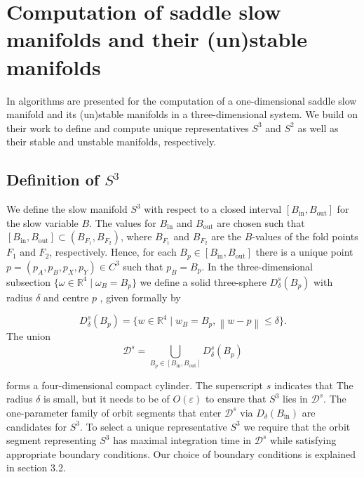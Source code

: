 \documentclass{ws-ijbc}
\begin{document}
 \section{Computation of saddle slow manifolds and their (un)stable manifolds}

In \cite{Saeed_Paper} algorithms are presented for the computation of a one-dimensional saddle slow manifold and its (un)stable manifolds in a three-dimensional system.  We build on their work to define and compute unique representatives $S^3$ and $S^2$ as well as their stable and unstable manifolds, respectively.

\subsection{Definition of $S^3$}    
We define the slow manifold $S^3$ with respect to a closed interval $[B_{\mathrm{in}},B_{\mathrm{out}}]$ for the slow variable $B$.  The values for $B_{\mathrm{in}}$ and $B_{\mathrm{out}}$ are chosen such that $[B_{\mathrm{in}},B_{\mathrm{out}}] \subset (B_{F_1}, B_{F_2})$, where $B_{F_1}$ and $B_{F_2}$ are the $B$-values of the fold points $F_1$ and $F_2$, respectively.  Hence, for each $B_p \in [B_{\mathrm{in}},B_{\mathrm{out}}]$ there is a unique point $p=(p_A,p_B,p_X,p_Y) \in C^3$ such that $p_B = B_p$.  In the three-dimensional subsection $\{ \omega \in \mathbb{R}^4 \; | \; \omega_B=B_p\}$ we define a solid three-sphere $D^s_\delta(B_p)$ with radius $\delta$ and centre $p$ , given formally by

\begin{equation*}
D^s_\delta(B_p)=\{w \in \mathbb{R}^4 \; | \; w_B = B_p, \left\lVert w-p \right\rVert \leq \delta\}.
\end{equation*}    
\noindent
The union 
\begin{equation*}
\mathscr{D}^s = \bigcup\limits_{B_p \in [B_{\mathrm{in}}, B_{\mathrm{out}}]}^{} D^s_\delta(B_p)
\end{equation*}


\noindent
forms a four-dimensional compact cylinder.  The superscript $s$ indicates that   The radius $\delta$ is small, but it needs to be of $O(\varepsilon)$ to ensure that $S^3$ lies in $\mathscr{D}^s$.  The one-parameter family of orbit segments that enter $\mathscr{D}^s$ via $D_\delta(B_{\mathrm{in}})$ are candidates for $S^3$.   To select a unique representative $S^3$ we require that the orbit segment representing $S^3$ has maximal integration time in $\mathscr{D}^s$ while satisfying appropriate boundary conditions.  Our choice of boundary conditions is explained in section 3.2.
    
\end{document}
